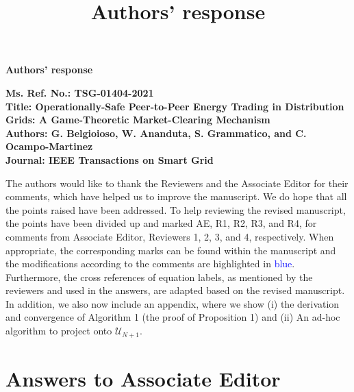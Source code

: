\documentclass[11pt]{article}
\title{Authors' response}
\date{}
\newcommand{\mc}{\mathcal}
\newcommand{\0}{\mathbf{0}}
\newcommand{\1}{\mathbf{1}}
\begin{document}

\begin{center}
\textbf{\Large Authors' response}
\end{center}
\vspace{0.5cm}
\noindent

\textbf{Ms. Ref. No.: TSG-01404-2021}  \\
\textbf{Title: Operationally-Safe Peer-to-Peer Energy Trading in Distribution Grids: A Game-Theoretic Market-Clearing Mechanism}   \\
\textbf{Authors: G. Belgioioso, W. Ananduta, S. Grammatico, and C. Ocampo-Martinez}   \\
\textbf{Journal: IEEE Transactions on Smart Grid}  


\setcounter{page}{1}

The authors would like to thank the Reviewers and the Associate Editor for their comments, which have helped us to improve the manuscript. We do hope that all the points raised have been addressed. {To help reviewing the revised manuscript,} the points have been divided up and marked AE, R1, R2, R3, and R4, for comments from Associate Editor, Reviewers 1, 2, 3, and 4, respectively. When appropriate, the corresponding marks can be found within the manuscript and the modifications according to the comments are highlighted in \textcolor{blue}{blue}. Furthermore, the cross references of equation labels, as mentioned by the reviewers and used in the answers, are adapted based on the revised manuscript. In addition, we also now include an appendix, where we show (i) the derivation and convergence of Algorithm 1 (the proof of Proposition 1) and (ii) An ad-hoc algorithm to project onto $\mc U_{N+1}$.%


\section*{Answers to Associate Editor}
\end{document}
